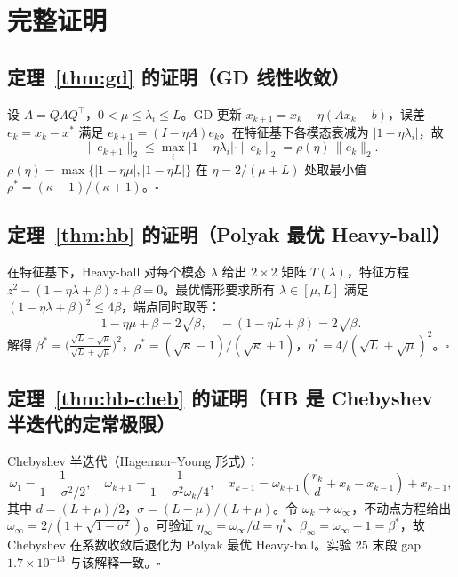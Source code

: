 \section{完整证明}
\label{app:proofs}

\subsection{定理~\ref{thm:gd} 的证明（GD 线性收敛）}

设 $A = Q\Lambda Q^\top$，$0 < \mu \le \lambda_i \le L$。GD 更新 $x_{k+1} = x_k - \eta(A x_k - b)$，误差 $e_k = x_k - x^*$ 满足 $e_{k+1} = (I - \eta A) e_k$。在特征基下各模态衰减为 $|1 - \eta\lambda_i|$，故
\[
  \|e_{k+1}\|_2 \le \max_i |1 - \eta\lambda_i| \cdot \|e_k\|_2 = \rho(\eta)\,\|e_k\|_2.
\]
$\rho(\eta) = \max\{|1 - \eta\mu|, |1 - \eta L|\}$ 在 $\eta = 2/(\mu+L)$ 处取最小值 $\rho^* = (\kappa-1)/(\kappa+1)$。$\square$

\subsection{定理~\ref{thm:hb} 的证明（Polyak 最优 Heavy-ball）}

在特征基下，Heavy-ball 对每个模态 $\lambda$ 给出 $2\times 2$ 矩阵 $T(\lambda)$，特征方程 $z^2 - (1 - \eta\lambda + \beta) z + \beta = 0$。最优情形要求所有 $\lambda\in[\mu,L]$ 满足 $(1 - \eta\lambda + \beta)^2 \le 4\beta$，端点同时取等：
\[
  1 - \eta\mu + \beta = 2\sqrt\beta,\quad -(1 - \eta L + \beta) = 2\sqrt\beta.
\]
解得 $\beta^* = \bigl(\frac{\sqrt L - \sqrt\mu}{\sqrt L + \sqrt\mu}\bigr)^2$，$\rho^* = (\sqrt\kappa - 1)/(\sqrt\kappa + 1)$，$\eta^* = 4/(\sqrt L + \sqrt\mu)^2$。$\square$

\subsection{定理~\ref{thm:hb-cheb} 的证明（HB 是 Chebyshev 半迭代的定常极限）}

Chebyshev 半迭代（Hageman--Young 形式）：
\[
  \omega_1 = \frac{1}{1 - \sigma^2/2},\quad
  \omega_{k+1} = \frac{1}{1 - \sigma^2 \omega_k / 4},\quad
  x_{k+1} = \omega_{k+1}\left(\frac{r_k}{d} + x_k - x_{k-1}\right) + x_{k-1},
\]
其中 $d = (L+\mu)/2$，$\sigma = (L-\mu)/(L+\mu)$。令 $\omega_k \to \omega_\infty$，不动点方程给出 $\omega_\infty = 2/(1 + \sqrt{1-\sigma^2})$。可验证 $\eta_\infty = \omega_\infty/d = \eta^*$、$\beta_\infty = \omega_\infty - 1 = \beta^*$，故 Chebyshev 在系数收敛后退化为 Polyak 最优 Heavy-ball。实验 25 末段 gap $1.7\times 10^{-13}$ 与该解释一致。$\square$


